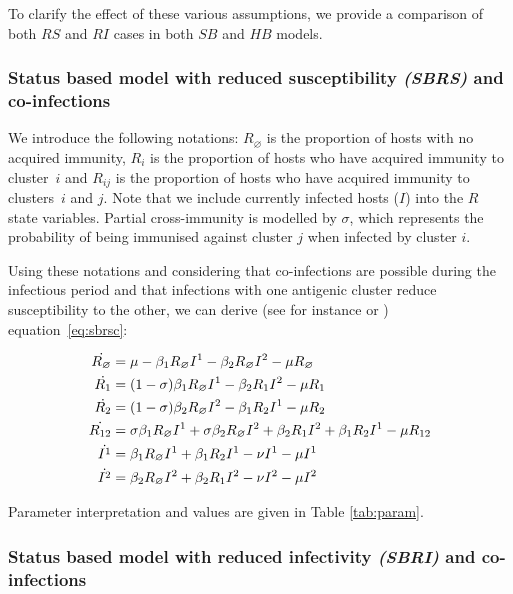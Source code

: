 To clarify the effect of these various assumptions, we provide a
comparison of both $RS$ and $RI$ cases in both $SB$ and $HB$ models.


\subsubsection{Status based model with reduced susceptibility
  \textit{(SBRS)} and co-infections}

We introduce the following notations: $R_\varnothing$ is the
proportion of hosts with no acquired immunity, $R_i$ is the proportion
of hosts who have acquired immunity to cluster~$i$ and $R_{ij}$ is the
proportion of hosts who have acquired immunity to clusters~$i$ and
$j$. Note that we include currently infected hosts ($I$) into the $R$
state variables. Partial cross-immunity is modelled by $\sigma$, which
represents the probability of being immunised against cluster $j$ when
infected by cluster $i$.

Using these notations and considering that co-infections are possible
during the infectious period and that infections with one antigenic
cluster reduce susceptibility to the other, we can derive (see for
instance \citet{Kryazhimskiy2007} or \citet{Gog2002a} )
equation~\eqref{eq:sbrsc}:

\begin{align}
\dot{R_\varnothing} & = \mu -\beta_1 R_\varnothing I^1 -\beta_2 R_\varnothing I^2 -\mu R_\varnothing  \label{eq:sbrsc}\\
\dot{R_1} & = (1-\sigma) \beta_1 R_\varnothing I^1 - \beta_2 R_1 I^2 -\mu R_1  \notag \\
\dot{R_2} & = (1-\sigma) \beta_2 R_\varnothing I^2 - \beta_1 R_2 I^1 -\mu R_2  \notag \\
\dot{R_{12}} & = \sigma \beta_1 R_\varnothing I^1 + \sigma \beta_2 R_\varnothing I^2 + \beta_2 R_1 I^2 + \beta_1 R_2 I^1 -\mu R_{12}  \notag \\
\dot{I^1} & = \beta_1 R_\varnothing I^1 + \beta_1 R_2 I^1 -\nu I^1  -\mu I^1 \notag \\
\dot{I^2} & = \beta_2 R_\varnothing I^2 + \beta_2 R_1 I^2 -\nu I^2  -\mu I^2 \notag 
\end{align}

Parameter interpretation and values are given in Table
\ref{tab:param}.


\subsubsection{Status based model with reduced infectivity
  \textit{(SBRI)} and co-infections}

